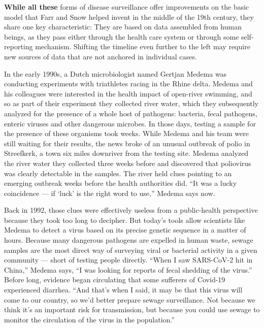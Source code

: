 \textbf{While all these} forms of disease surveillance offer
improvements on the basic model that Farr and Snow helped invent in the
middle of the 19th century, they share one key characteristic: They are
based on data assembled from human beings, as they pass either through
the health care system or through some self-reporting mechanism.
Shifting the timeline even further to the left may require new sources
of data that are not anchored in individual cases.

In the early 1990s, a Dutch microbiologist named Gertjan Medema was
conducting experiments with triathletes racing in the Rhine delta.
Medema and his colleagues were interested in the health impact of
open-river swimming, and so as part of their experiment they collected
river water, which they subsequently analyzed for the presence of a
whole host of pathogens: bacteria, fecal pathogens, enteric viruses and
other dangerous microbes. In those days, testing a sample for the
presence of these organisms took weeks. While Medema and his team were
still waiting for their results, the news broke of an unusual outbreak
of polio in Streefkerk, a town six miles downriver from the testing
site. Medema analyzed the river water they collected three weeks before
and discovered that poliovirus was clearly detectable in the samples.
The river held clues pointing to an emerging outbreak weeks before the
health authorities did. ``It was a lucky coincidence --- if `luck' is
the right word to use,'' Medema says now.

Back in 1992, those clues were effectively useless from a public-health
perspective because they took too long to decipher. But today's tools
allow scientists like Medema to detect a virus based on its precise
genetic sequence in a matter of hours. Because many dangerous pathogens
are expelled in human waste, sewage samples are the most direct way of
surveying viral or bacterial activity in a given community --- short of
testing people directly. ``When I saw SARS-CoV-2 hit in China,'' Medema
says, ``I was looking for reports of fecal shedding of the virus.''
Before long, evidence began circulating that some sufferers of Covid-19
experienced diarrhea. ``And that's when I said, it may be that this
virus will come to our country, so we'd better prepare sewage
surveillance. Not because we think it's an important risk for
transmission, but because you could use sewage to monitor the
circulation of the virus in the population.''

